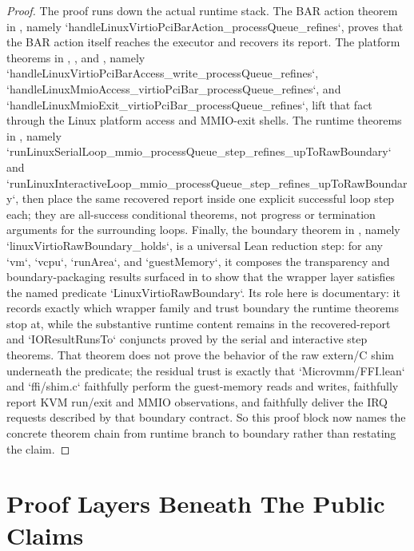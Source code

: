 \begin{proof}
\leanok
{}
The proof runs down the actual runtime stack.
The BAR action theorem in , namely `handleLinuxVirtioPciBarAction_processQueue_refines`, proves that the BAR action itself reaches the executor and recovers its report.
The platform theorems in , , and , namely `handleLinuxVirtioPciBarAccess_write_processQueue_refines`, `handleLinuxMmioAccess_virtioPciBar_processQueue_refines`, and `handleLinuxMmioExit_virtioPciBar_processQueue_refines`, lift that fact through the Linux platform access and MMIO-exit shells.
The runtime theorems in , namely `runLinuxSerialLoop_mmio_processQueue_step_refines_upToRawBoundary` and `runLinuxInteractiveLoop_mmio_processQueue_step_refines_upToRawBoundary`, then place the same recovered report inside one explicit successful loop step each; they are all-success conditional theorems, not progress or termination arguments for the surrounding loops.
Finally, the boundary theorem in , namely `linuxVirtioRawBoundary_holds`, is a universal Lean reduction step: for any `vm`, `vcpu`, `runArea`, and `guestMemory`, it composes the transparency and boundary-packaging results surfaced in  to show that the wrapper layer satisfies the named predicate `LinuxVirtioRawBoundary`.
Its role here is documentary: it records exactly which wrapper family and trust boundary the runtime theorems stop at, while the substantive runtime content remains in the recovered-report and `IOResultRunsTo` conjuncts proved by the serial and interactive step theorems.
That theorem does not prove the behavior of the raw extern/C shim underneath the predicate; the residual trust is exactly that `Microvmm/FFI.lean` and `ffi/shim.c` faithfully perform the guest-memory reads and writes, faithfully report KVM run/exit and MMIO observations, and faithfully deliver the IRQ requests described by that boundary contract.
So this proof block now names the concrete theorem chain from runtime branch to boundary rather than restating the claim.
\end{proof}

\chapter{Proof Layers Beneath The Public Claims}

